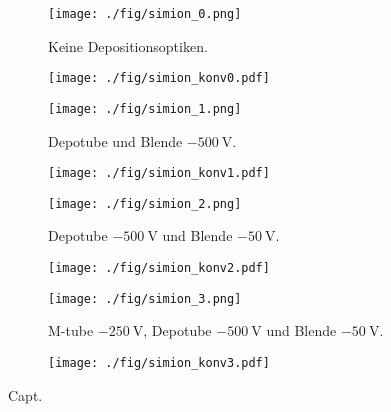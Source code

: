 \begin{figure}
  \begin{subfigure}[h]{0.50\textwidth}
    \texttt{[image: ./fig/simion\_0.png]}
    \caption{Keine Depositionsoptiken.}
    \label{fig:konv0}
  \end{subfigure}\hfill
  \begin{subfigure}[h]{0.45\textwidth}
    \texttt{[image: ./fig/simion\_konv0.pdf]}
    \label{fig:konv1}
  \end{subfigure}\hfill
  \begin{subfigure}[h]{0.50\textwidth}
    \texttt{[image: ./fig/simion\_1.png]}
    \caption{Depotube und Blende $\SI{-500}{\volt}$.}
    \label{fig:konv2}
  \end{subfigure}\hfill
  \begin{subfigure}[h]{0.45\textwidth}
    \texttt{[image: ./fig/simion\_konv1.pdf]}
    \label{fig:konv3}
  \end{subfigure}\hfill
  \begin{subfigure}[h]{0.50\textwidth}
    \texttt{[image: ./fig/simion\_2.png]}
    \caption{Depotube $\SI{-500}{\volt}$ und Blende $\SI{-50}{\volt}$.}
    \label{fig:konv4}
  \end{subfigure}\hfill
  \begin{subfigure}[h]{0.45\textwidth}
    \texttt{[image: ./fig/simion\_konv2.pdf]}
    \label{fig:konv5}
  \end{subfigure}\hfill
  \begin{subfigure}[h]{0.50\textwidth}
    \texttt{[image: ./fig/simion\_3.png]}
    \caption{M-tube $\SI{-250}{\volt}$, Depotube $\SI{-500}{\volt}$ und Blende $\SI{-50}{\volt}$.}
    \label{fig:konv6}
  \end{subfigure}\hfill
  \begin{subfigure}[h]{0.45\textwidth}
    \texttt{[image: ./fig/simion\_konv3.pdf]}
    \label{fig:konv7}
  \end{subfigure}
  \caption{Capt.}
  \label{fig:simion_konv}
\end{figure}


